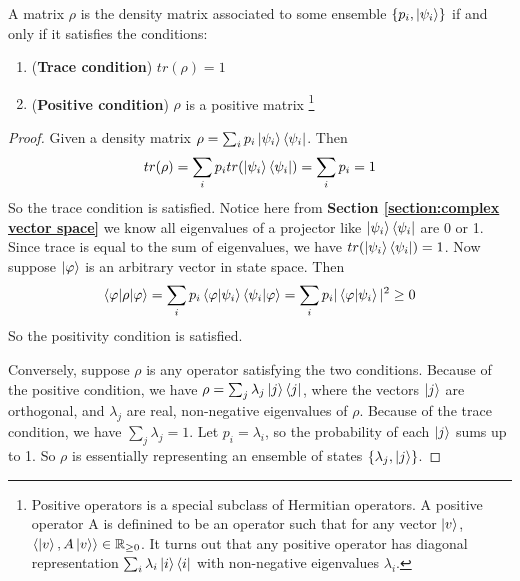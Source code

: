 


\begin{theorem}\label{thm: char of density matrix}
A matrix $\rho$ is the density matrix associated to some ensemble $\{p_i, \ket{\psi_i}\}$ if and only if it satisfies the conditions:
\begin{enumerate}
    \item (\textbf{Trace condition}) $tr(\rho)=1$
    \item (\textbf{Positive condition}) $\rho$ is a positive matrix \footnote{Positive operators is a special subclass of Hermitian operators. A positive operator A is definined to be an operator such that for any vector $\ket{v}$, $\langle \ket{v}, A\ket{v} \rangle \in \mathbb{R}_{\ge 0}$. It turns out that any positive operator has diagonal representation $\sum_i \lambda_i \ket{i}\bra{i}$ with non-negative eigenvalues $\lambda_i$.} 
\end{enumerate}
\end{theorem}

\begin{proof}
Given a density matrix $\rho=\sum_i p_i \ket{\psi_i}\bra{\psi_i}$. Then
\begin{equation}
    tr(\rho)=\sum_i p_i tr(\ket{\psi_i}\bra{\psi_i})=\sum_i p_i =1
\end{equation}
So the trace condition is satisfied. Notice here from \textbf{Section \ref{section:complex vector space}} we know all eigenvalues of a projector like $\ket{\psi_i}\bra{\psi_i}$ are 0 or 1. Since trace is equal to the sum of eigenvalues, we have $tr(\ket{\psi_i}\bra{\psi_i})=1$. Now suppose $\ket{\varphi}$ is an arbitrary vector in state space. Then
\begin{equation}
    \braket{\varphi|\rho|\varphi}=\sum_i p_i \braket{\varphi|\psi_i} \braket{\psi_i|\varphi}=\sum_i p_i |\braket{\varphi|\psi_i}|^2 \ge 0
\end{equation}
So the positivity condition is satisfied.

Conversely, suppose $\rho$ is any operator satisfying the two conditions. Because of the positive condition, we have $\rho=\sum_j \lambda_j \ket{j}\bra{j}$, where the vectors $\ket{j}$ are orthogonal, and $\lambda_j$ are real, non-negative eigenvalues of $\rho$. Because of the trace condition, we have $\sum_j \lambda_j=1$. Let $p_i=\lambda_i$, so the probability of each $\ket{j}$ sums up to 1. So $\rho$ is essentially representing an ensemble of states $\{\lambda_j, \ket{j}\}$.
\end{proof}

